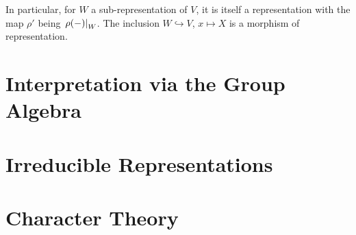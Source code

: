 \documentclass{article}
\begin{document}
\begin{remark}
    In particular, for $W$ a sub-representation of $V$, it is itself a representation with the map $\rho'$ being $\left.\rho(-)\right|_{W}$. The inclusion $W \hookrightarrow V$, $x \mapsto X$ is a morphism of representation.
\end{remark}

\section{Interpretation via the Group Algebra}

\section{Irreducible Representations}

\section{Character Theory}
\end{document}
